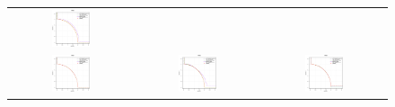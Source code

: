 \begin{figure}[H]
\begin{tabular}{ccc}
  \includegraphics[width=0.33\textwidth]{Figures_Chapter7/Results_Chapter4/Surface_eps_VSD_MOEA/WFG6.eps} \\
  \includegraphics[width=0.33\textwidth]{Figures_Chapter7/Results_Chapter4/Surface_eps_VSD_MOEA/WFG7.eps} &
  \includegraphics[width=0.33\textwidth]{Figures_Chapter7/Results_Chapter4/Surface_eps_VSD_MOEA/WFG8.eps} &
  \includegraphics[width=0.33\textwidth]{Figures_Chapter7/Results_Chapter4/Surface_eps_VSD_MOEA/WFG9.eps}
\end{tabular}
\end{figure}
